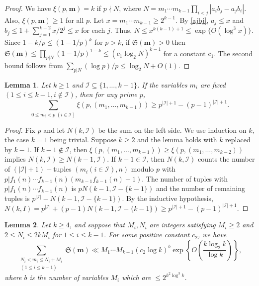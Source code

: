 \documentclass[12pt]{amsart}
\theoremstyle{remark}
\theoremstyle{plain}
\newtheorem{lem}{Lemma}[section]
\numberwithin{equation}{section}
\renewcommand{\SS}{\mathfrak{S}}  %
\renewcommand{\(}{\left(}
\renewcommand{\)}{\right)}
\newcommand{\pfrac}[2]{\left(\frac{#1}{#2}\right)}
\newcommand{\mm}{\ensuremath{\mathbf{m}}}
\newcommand{\II}{\mathcal{I}}
\renewcommand{\le}{\leqslant}
\renewcommand{\ge}{\geqslant}
\begin{document}
\begin{proof}  
We have $\xi(p,\mm)=k$ if $p\nmid N$, where
$N = m_1 \cdots m_{k-1} \prod_{i<j} |a_i b_j - a_j b_i|.$
Also, $\xi(p,\mm)\ge 1$ for all $p$.
Let $x=m_1 \cdots  m_{k-1} \ge 2^{k-1}$.  
By \eqref{ajbj}, $a_j\le x$ and
$b_j \le 1 + \sum_{j=1}^{k-2} x/2^j \le x$ for each $j$.  Thus,
$N\le x^{k(k-1)+1} \le \exp \{ O(\log^3 x) \}$.  Since
$1-k/p \le (1-1/p)^k$ for $p>k$, if $\SS(\mm)>0$ then 
$\SS(\mm)\le \prod_{p|N}(1-1/p)^{1-k}\le (c_1\log_2 N)^{k-1}$ for a constant
$c_1$.  The second bound follows from $\sum_{p|N} (\log p)/p \le \log_2 N+O(1)$.
\end{proof}



\begin{lem}\label{rhopm}  Let $k\ge 1$ and $\II \subseteq
  \{1,\ldots,k-1\}$.  If the variables $m_i$ are fixed $(1\le i\le
  k-1, i\not\in \II)$, then for any prime $p$,
$$
\sum_{0\le m_i <p \; (i\in \II)} \xi(p,(m_1,\ldots,m_{k-1})) \ge
p^{|\II|+1} - (p-1)^{|\II|+1}.
$$
\end{lem}

\begin{proof}   Fix $p$ and let $N(k,\II)$ be the sum on the left side. 
We use induction on $k$, the case $k=1$ being trivial.  Suppose $k\ge 2$
and the lemma holds with $k$ replaced by $k-1$.  If $k-1 \not\in \II$, then
$\xi(p,(m_1,\ldots,m_{k-1})) \ge \xi(p,(m_1,\ldots,m_{k-2}))$ implies
$N(k,\II) \ge N(k-1,\II)$.  If $k-1 \in \II$, then $N(k,\II)$ counts the number of 
$(|\II|+1)-$tuples $(m_i (i\in \II), n)$ modulo $p$ with
$p|f_1(n)\cdots f_{k-1}(n)(m_{k-1}f_{k-1}(n)+1)$.  The number of tuples with $p|f_1(n)\cdots f_{k-1}(n)$ is $p N(k-1,\II-\{k-1\})$ and the number of remaining tuples is $p^{|\II|}-N(k-1,\II-\{k-1\})$.  By the inductive hypothesis,
$N(k,I) = p^{|\II|} + (p-1) N(k-1,\II-\{k-1\}) \ge p^{|\II|+1} - (p-1)^{|\II|+1}.$
\end{proof}

%
%

\begin{lem}\label{singular}  Let $k\ge 4$, and suppose that $M_i,N_i$ are
  integers satisfying $M_i\ge 2$ and
$2\le N_i \le 2kM_i$ for $1\le i\le k-1$.  For some positive constant $c_2$, we have
\[
\sum_{\substack{N_i < m_i \le N_i+M_i \\ (1\le i\le k-1)}}
\SS(\mm) \ll M_1 \cdots M_{k-1} \( c_2 \log k \)^{b}
\exp \left\{ O\pfrac{k \log_2 k}{\log k} \right\},
\]
where $b$ is the number of variables $M_i$ which are $\le 2^{k^2\log^3 k}$.
\end{lem}
\end{document}
